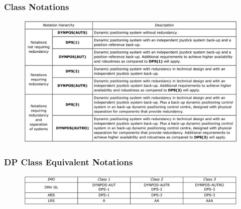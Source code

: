 \newpage
\subsubsection{Class Notations}\label{Sec:Class_Notations} 
\begin{figure}[h]
    \centering
    \includegraphics[width = \textwidth]{figures/DP_Class_notations.eps}
\end{figure}

\subsubsection{DP Class Equivalent Notations}\label{Sec:Equivalent_Notations} 
\begin{figure}[h]
    \centering
    \includegraphics[width = \textwidth]{figures/DP_Class_equivalent_notations.eps}
\end{figure}


\newpage
